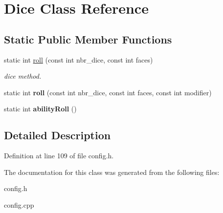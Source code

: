 \hypertarget{class_dice}{}\section{Dice Class Reference}
\label{class_dice}
\subsection*{Static Public Member Functions}
\begin{DoxyCompactItemize}
\item 
\hypertarget{class_dice_ac94cb9c94fccfc5579310769b39056a6}{}\label{class_dice_ac94cb9c94fccfc5579310769b39056a6} 
static int \hyperlink{class_dice_ac94cb9c94fccfc5579310769b39056a6}{roll} (const int nbr\+\_\+dice, const int faces)
\begin{DoxyCompactList}\small\item\em dice method. \end{DoxyCompactList}\item 
\hypertarget{class_dice_a1b9a9c31860b6e8b980ea5e3bf4494cd}{}\label{class_dice_a1b9a9c31860b6e8b980ea5e3bf4494cd} 
static int {\bfseries roll} (const int nbr\+\_\+dice, const int faces, const int modifier)
\item 
\hypertarget{class_dice_a8ad5ba0b908fba18df7c0e8795fc55fb}{}\label{class_dice_a8ad5ba0b908fba18df7c0e8795fc55fb} 
static int {\bfseries ability\+Roll} ()
\end{DoxyCompactItemize}


\subsection{Detailed Description}


Definition at line 109 of file config.\+h.



The documentation for this class was generated from the following files\+:\begin{DoxyCompactItemize}
\item 
config.\+h\item 
config.\+cpp\end{DoxyCompactItemize}
